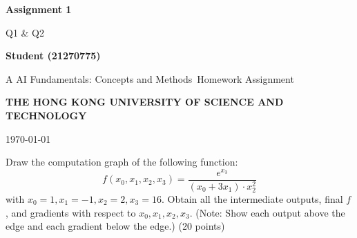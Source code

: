 \documentclass[10pt, a4paper]{article}
\newcommand\course{AI Fundamentals: Concepts and Methods}
\newcommand\hwnumber{1}
\newcommand\Information{Student (21270775)}
\begin{document}
\begin{titlepage}
    \begin{center}
        \vspace*{3cm}
            
        \Huge
        \textbf{Assignment \hwnumber}
            
        \vspace{1cm}
        \huge
        Q1 \& Q2
            
        \vspace{1.5cm}
        \Large
            
        \textbf{\Information}
        
            
        \vfill
        
        A \course \ Homework Assignment
            
        \vspace{1cm}

        \textbf{\large THE HONG KONG UNIVERSITY OF SCIENCE AND TECHNOLOGY}
        \\
        
        \Large
        
        \today
            
    \end{center}
\end{titlepage}

\newpage

\begin{Problem}
Draw the computation graph of the following function:
$$f(x_0, x_1, x_2, x_3) = \frac{e^{x_3}}{(x_0 + 3x_1) \cdot x_2^2}$$
with $x_0 = 1, x_1 = -1, x_2 = 2, x_3 = 16$. Obtain all the intermediate outputs, final $f$, and gradients with respect to $x_0, x_1, x_2, x_3$. (Note: Show each output above the edge and each gradient below the edge.) (20 points)
\end{Problem}
\end{document}
